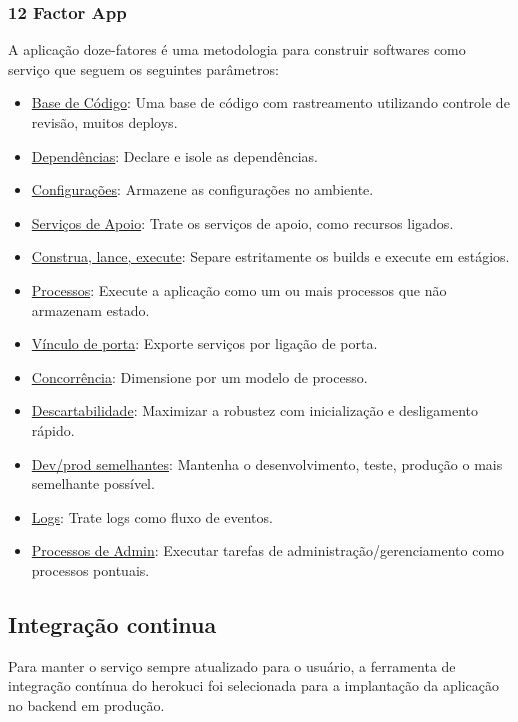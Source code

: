 \subsubsection{12 Factor App}

A aplicação doze-fatores é uma metodologia para construir softwares como serviço que seguem os seguintes parâmetros:

\begin{itemize}
    \item \underline{Base de Código}: Uma base de código com rastreamento utilizando controle de revisão, muitos \glspl{deploy}.
    \item \underline{Dependências}: Declare e isole as dependências.
    \item \underline{Configurações}: Armazene as configurações no ambiente.
    \item \underline{Serviços de Apoio}: Trate os serviços de apoio, como recursos ligados.
    \item \underline{Construa, lance, execute}: Separe estritamente os builds e execute em estágios.
    \item \underline{Processos}: Execute a aplicação como um ou mais processos que não armazenam estado.
    \item \underline{Vínculo de porta}: Exporte serviços por ligação de porta.
    \item \underline{Concorrência}: Dimensione por um modelo de processo.
    \item \underline{Descartabilidade}: Maximizar a robustez com inicialização e desligamento rápido.
    \item \underline{Dev/prod semelhantes}: Mantenha o desenvolvimento, teste, produção o mais semelhante possível.
    \item \underline{Logs}: Trate logs como fluxo de eventos.
    \item \underline{Processos de Admin}: Executar tarefas de administração/gerenciamento como processos pontuais.
\end{itemize}

\subsection{Integração continua}
Para manter o serviço sempre atualizado para o usuário, a ferramenta de integração contínua do \gls{herokuci} foi selecionada para a implantação da aplicação no \gls{backend} em produção.

